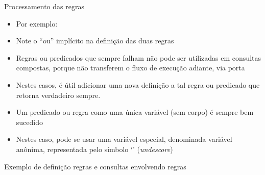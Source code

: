 \begin{frame}[fragile]{Processamento das regras}

    \begin{itemize}
        \item Por exemplo:


        \item Note o ``ou'' implícito na definição das duas regras

        \item Regras ou predicados que sempre falham não pode ser utilizadas em consultas 
            compostas, porque não transferem o fluxo de execução adiante, via porta 

        \item Nestes casos, é útil adicionar uma nova definição a tal regra ou predicado que 
            retorna verdadeiro sempre.

        \item Um predicado ou regra como uma única variável (sem corpo) é sempre bem sucedido

        \item Nestes caso, pode se usar uma variável especial, denominada variável anônima,
            representada pelo símbolo `' (\textit{undescore})

    \end{itemize}

\end{frame}


\begin{frame}[fragile]{Exemplo de definição regras e consultas envolvendo regras}


\end{frame}

